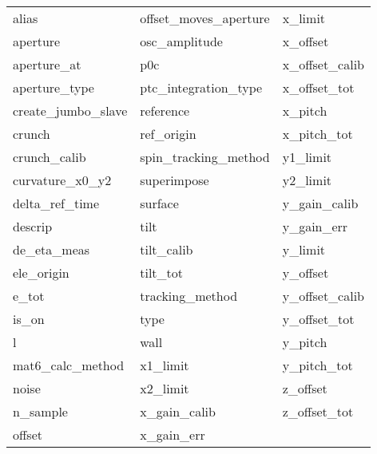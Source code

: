  \begin{tabular}{lll} \toprule
alias                       & offset_moves_aperture       & x_limit                     \\
aperture                    & osc_amplitude               & x_offset                    \\
aperture_at                 & p0c                         & x_offset_calib              \\
aperture_type               & ptc_integration_type        & x_offset_tot                \\
create_jumbo_slave          & reference                   & x_pitch                     \\
crunch                      & ref_origin                  & x_pitch_tot                 \\
crunch_calib                & spin_tracking_method        & y1_limit                    \\
curvature_x0_y2             & superimpose                 & y2_limit                    \\
delta_ref_time              & surface                     & y_gain_calib                \\
descrip                     & tilt                        & y_gain_err                  \\
de_eta_meas                 & tilt_calib                  & y_limit                     \\
ele_origin                  & tilt_tot                    & y_offset                    \\
e_tot                       & tracking_method             & y_offset_calib              \\
is_on                       & type                        & y_offset_tot                \\
l                           & wall                        & y_pitch                     \\
mat6_calc_method            & x1_limit                    & y_pitch_tot                 \\
noise                       & x2_limit                    & z_offset                    \\
n_sample                    & x_gain_calib                & z_offset_tot                \\
offset                      & x_gain_err                  &                             \\
 \bottomrule
 \end{tabular}
 \vfill
 
